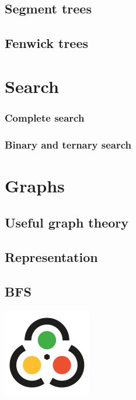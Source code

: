 \documentclass[10pt]{book}
\newcommand{\kattis}[1]{%
  \begin{mdframed}
  \includegraphics[height=0.9\baselineskip]{Kattis}
  \def\nextitem{\def\nextitem{, }}
  \renewcommand*{\do}[1]{\nextitem\kattislink{##1}}
  \docsvlist{#1}
  \end{mdframed}
}
\newcommand{\kattislink}[1]{\href{https://open.kattis.com/problems/#1}{\texttt{#1}}}
\newif\iftodos
\newcommand{\todo}[1]{\iftodos\textcolor{red}{[TODO: #1]}\fi}
\begin{document}
\section{Segment trees}

\section{Fenwick trees}

\chapter{Search}

\subsection{Complete search}

\todo{Complete search aka brute force}

\subsection{Binary and ternary search}

\todo{Binary search on an array; binary search on unbounded function
  on the integers; binary search on real interval; ternary search}

\chapter{Graphs}

\section{Useful graph theory}

\todo{characterization of trees.}

\section{Representation}

\todo{Adjacency matrix, adjacency maps.  Edge objects. Implicit graphs.}

\section{BFS}

\todo{Code for BFS with level labelling, parent map.}

\kattis{brexit}
\end{document}
